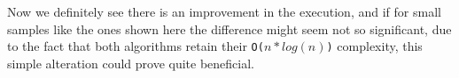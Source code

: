 \documentclass[a4paper,11pt]{article}
\begin{document}
Now we definitely see there is an improvement in the execution, and if for small samples like the ones shown here the difference might seem not so significant, due to the fact that both algorithms retain their {\tt O(\begin{math} n*log(n)\end{math})} complexity, this simple alteration could prove quite beneficial.
\end{document}
